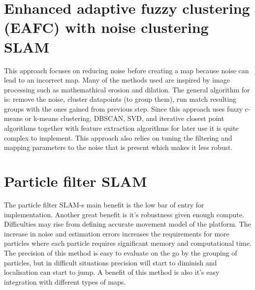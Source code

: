 \documentclass[12pt, a4paper, onecolumn]{article}
\begin{document}
\section{Enhanced adaptive fuzzy clustering (EAFC) with noise clustering SLAM \cite{AlgorithmsForIndoorMapping}}
This approach focuses on reducing noise before creating a map because noise can lead to an incorrect map.
Many of the methods used are inspired by image processing such as mathemathical erosion and dilation.
The general algorithm for is: remove the noise, cluster datapoints (to group them), run match resulting groups with the ones gained from previous step.
Since this approach uses fuzzy c-means or k-means clustering, DBSCAN, SVD, and iterative closest point algorithms together with feature extraction algorithms for later use it is quite complex to implement.
This approach also relies on tuning the filtering and mapping parameters to the noise that is present which makes it less robust.

\section{Particle filter SLAM \cite{ParticleFilterSLAM}}
The particle filter SLAM-s main benefit is the low bar of entry for implementation.
Another great benefit is it's robustness given enough compute.
Difficulties may rise from defining accurate movement model of the platform.
The increase in noise and estimation errors increases the requirements for more particles where each particle requires significant memory and computational time.
The precision of this method is easy to evaluate on the go by the grouping of particles, but in difficult situations precision will start to diminish and localisation can start to jump.
A benefit of this method is also it's easy integration with different types of maps.
\end{document}
